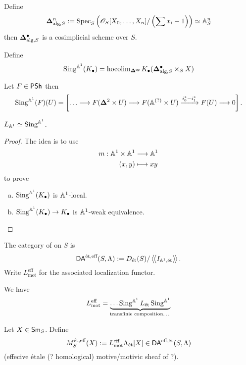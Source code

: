 \begin{definition}
	Define
	\[
		\mathbf{\Delta}^{n}_{\text{alg},S} := \operatorname{Spec}_S\left( \mathscr{O}_S[X_0,\dots,X_n] / \left( \sum x_i-1 \right)  \right) \simeq \mathbb A_S^{n}
	\] 
	then $\mathbf{\Delta}_{\text{alg},S}^{\bullet}$ is a cosimplicial scheme over $S$.
\end{definition}
\begin{definition}
	Define
	\[
		\operatorname{Sing}^{\mathbb A^{1}}(K_\bullet) = \operatorname{hocolim}_{\mathbf{\Delta}^\mathsf{op}} K_\bullet(\mathbf{\Delta}_{\text{alg},S}^{\bullet}\times_S X)
	\] 
\end{definition}
\begin{example}
	Let $F\in \mathsf{PSh}$ then
	\[
		\Sing^{\Aff^{1}}(F)(U) = \left[ \dots \to  F(\bb{\Delta}^2\times U)\to F(\Aff^{(?)}\times U) \xrightarrow{i_0^{*}-i_1^{*}}  F(U) \to 0 \right] .
	\] 	
\end{example}
\begin{proposition}
	$L_{\mathbb A^{1}}\simeq \operatorname{Sing}^{\mathbb A^{1}}$.
\end{proposition}
\begin{proof}
	The idea is to use
	\begin{align*}
		m: \mathbb A^{1}\times \mathbb A^{1} &\longrightarrow \mathbb A^{1} \\
		(x,y) &\longmapsto xy
	\end{align*}
	to prove
	\begin{enumerate}[a)]
		\item $\operatorname{Sing}^{\mathbb A^{1}}(K_\bullet)$ is $\mathbb A^{1}$-local.
		\item $\Sing^{\Aff^{1}}(K_\bullet)\to K_\bullet$ is $\mathbb A^{1}$-weak equivalence.
	\end{enumerate}
\end{proof}
\begin{definition}
	The category of  on $S$ is
	\[
		\mathsf{DA}^{\text{\'et},\text{eff}}(S,\Lambda) := D_{\text{\'et}}(S) / \left\langle\!\left\langle I_{\mathbb A^{1},\text{\'et}} \right\rangle\!\right\rangle.
	\] 
	Write $L_{\text{mot}}^{\text{eff}}$ for the associated localization functor.
\end{definition}
\begin{lemma}
	We have
	\[
		L_{\text{mot}}^{\text{eff}} = \underbrace{\dots \operatorname{Sing}^{\mathbb A^{1}}L_{\text{\'et}}\operatorname{Sing}^{\mathbb A^{1}}}_{\text{transfinie composition\dots}}
	\] 
\end{lemma}
\begin{definition}
	Let $X\in \mathsf{Sm}_S$. Define
	\[
		M_S^{\text{\'et},\text{eff}}(X) := L_{\text{mot}}^{\text{eff}}\Lambda_{\text{\'et}}[X]\in \mathsf{DA}^{\text{eff},\text{\'et}}(S,\Lambda)
	\] 
	(effecive \'etale (? homological) motive/motivic sheaf of ?).
\end{definition}
